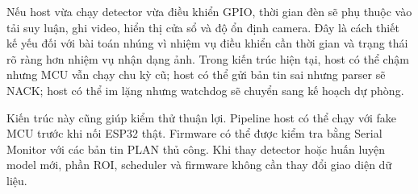Nếu host vừa chạy detector vừa điều khiển GPIO, thời gian đèn sẽ phụ thuộc vào tải suy luận, ghi video, hiển thị cửa sổ và độ ổn định camera. Đây là cách thiết kế yếu đối với bài toán nhúng vì nhiệm vụ điều khiển cần thời gian và trạng thái rõ ràng hơn nhiệm vụ nhận dạng ảnh. Trong kiến trúc hiện tại, host có thể chậm nhưng MCU vẫn chạy chu kỳ cũ; host có thể gửi bản tin sai nhưng parser sẽ NACK; host có thể im lặng nhưng watchdog sẽ chuyển sang kế hoạch dự phòng.

Kiến trúc này cũng giúp kiểm thử thuận lợi. Pipeline host có thể chạy với fake MCU trước khi nối ESP32 thật. Firmware có thể được kiểm tra bằng Serial Monitor với các bản tin PLAN thủ công. Khi thay detector hoặc huấn luyện model mới, phần ROI, scheduler và firmware không cần thay đổi giao diện dữ liệu.
